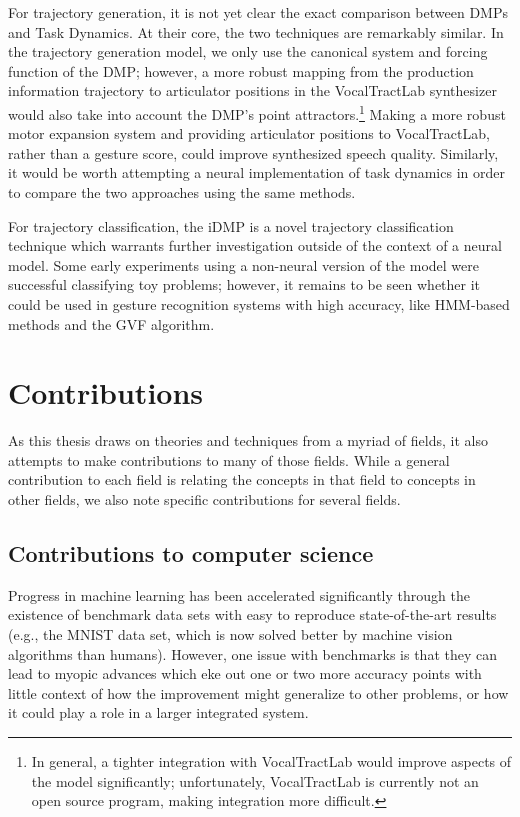 For trajectory generation,
it is not yet clear
the exact comparison between DMPs
and Task Dynamics.
At their core, the two techniques
are remarkably similar.
In the trajectory generation model,
we only use the canonical system
and forcing function of the DMP;
however, a more robust mapping
from the production information trajectory
to articulator positions in
the VocalTractLab synthesizer
would also take into account
the DMP's point attractors.\footnote{
  In general, a tighter integration with
  VocalTractLab would improve aspects
  of the model significantly;
  unfortunately, VocalTractLab
  is currently not an open source program,
  making integration more difficult.}
Making a more robust motor expansion system
and providing articulator positions
to VocalTractLab,
rather than a gesture score,
could improve synthesized speech quality.
Similarly, it would be worth
attempting a neural implementation
of task dynamics in order to
compare the two approaches
using the same methods.

For trajectory classification,
the iDMP is a novel trajectory classification technique
which warrants further investigation
outside of the context of a neural model.
Some early experiments using a non-neural
version of the model were successful
classifying toy problems;
however, it remains to be seen
whether it could be used in
gesture recognition systems
with high accuracy,
like HMM-based methods and the GVF algorithm.

\section{Contributions}

As this thesis draws on theories
and techniques from a myriad of fields,
it also attempts to make contributions
to many of those fields.
While a general contribution to each field
is relating the concepts in that field
to concepts in other fields,
we also note specific contributions
for several fields.

\subsection{Contributions to computer science}

Progress in machine learning
has been accelerated significantly
through the existence of
benchmark data sets with
easy to reproduce
state-of-the-art results
(e.g., the MNIST data set,
which is now solved better
by machine vision algorithms than humans).
However, one issue with benchmarks
is that they can lead to myopic advances
which eke out one or two more
accuracy points with little
context of how the improvement
might generalize to other problems,
or how it could play a role
in a larger integrated system.

